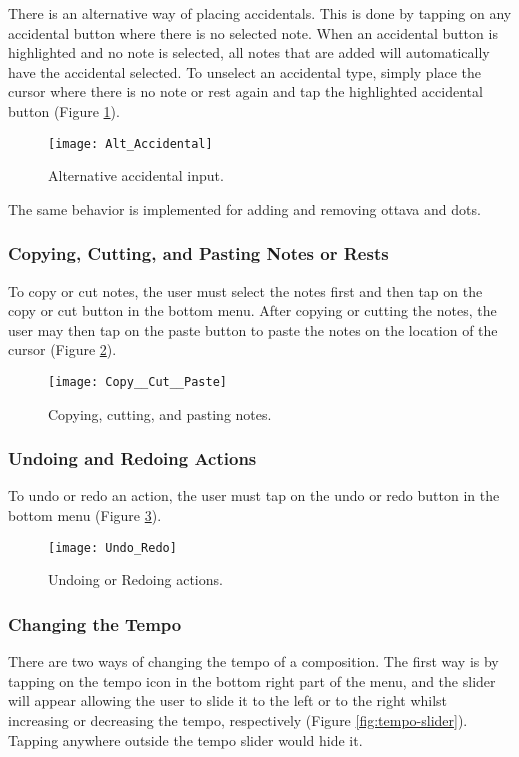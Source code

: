 There is an alternative way of placing accidentals. This is done by tapping on any accidental button where there is no selected note. When an accidental button is highlighted and no note is selected, all notes that are added will automatically have the accidental selected. To unselect an accidental type, simply place the cursor where there is no note or rest again and tap the highlighted accidental button (Figure \ref{fig:alt-accidental}).

\begin{figure}[H]
	\centering
	\texttt{[image: Alt\_Accidental]}
    \caption{Alternative accidental input.}
    \label{fig:alt-accidental}
\end{figure}

The same behavior is implemented for adding and removing ottava and dots.

\subsubsection{Copying, Cutting, and Pasting Notes or Rests}
To copy or cut notes, the user must select the notes first and then tap on the copy or cut button in the bottom menu. After copying or cutting the notes, the user may then tap on the paste button to paste the notes on the location of the cursor (Figure \ref{fig:copy-cut-paste}).

\begin{figure}[H]
	\centering
	\texttt{[image: Copy\_\_Cut\_\_Paste]}
    \caption{Copying, cutting, and pasting notes.}
    \label{fig:copy-cut-paste}
\end{figure}

\subsubsection{Undoing and Redoing Actions}
To undo or redo an action, the user must tap on the undo or redo button in the bottom menu (Figure \ref{fig:undo-redo}).

\begin{figure}[H]
	\centering
	\texttt{[image: Undo\_Redo]}
    \caption{Undoing or Redoing actions.}
    \label{fig:undo-redo}
\end{figure}

\subsubsection{Changing the Tempo}
There are two ways of changing the tempo of a composition. The first way is by tapping on the tempo icon in the bottom right part of the menu, and the slider will appear allowing the user to slide it to the left or to the right whilst increasing or decreasing the tempo, respectively (Figure \ref{fig:tempo-slider}). Tapping anywhere outside the tempo slider would hide it.

